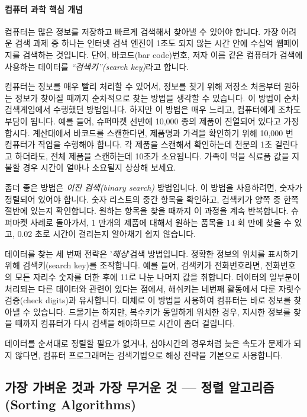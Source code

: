 \documentclass[]{article}
\begin{document}
\mbox{}\paragraph{컴퓨터 과학 핵심 개념}\label{section-101}

컴퓨터는 많은 정보를 저장하고 빠르게 검색해서 찾아낼 수 있어야 합니다.
가장 어려운 검색 과제 중 하나는 인터넷 검색 엔진이 1초도 되지 않는 시간
안에 수십억 웹페이지를 검색하는 것입니다. 단어, 바코드(bar code)번호,
저자 이름 같은 컴퓨터가 검색에 사용하는 데이터를 \emph{``검색키''(search
key)}라고 합니다.

컴퓨터는 정보를 매우 빨리 처리할 수 있어서, 정보를 찾기 위해 저장소
처음부터 원하는 정보가 찾아질 때까지 순차적으로 찾는 방법을 생각할 수
있습니다. 이 방법이 순차검색게임에서 수행했던 방법입니다. 하지만 이
방법은 매우 느리고, 컴퓨터에게 조차도 부담이 됩니다. 예를 들어, 슈퍼마켓
선반에 10,000 종의 제품이 진열되어 있다고 가정합시다. 계산대에서
바코드를 스캔한다면, 제품명과 가격을 확인하기 위해 10,000 번 컴퓨터가
작업을 수행해야 합니다. 각 제품을 스캔해서 확인하는데 천분의 1초
걸린다고 하더라도, 전체 제품을 스캔하는데 10초가 소요됩니다. 가족이 먹을
식료품 값을 지불할 경우 시간이 얼마나 소요될지 상상해 보세요.

좀더 좋은 방법은 \emph{이진 검색(binary search)} 방법입니다. 이 방법을
사용하려면, 숫자가 정렬되어 있어야 합니다. 숫자 리스트의 중간 항목을
확인하고, 검색키가 양쪽 중 한쪽 절반에 있는지 확인합니다. 원하는 항목을
찾을 때까지 이 과정을 계속 반복합니다. 슈퍼마켓 사례로 돌아가서, 1
만개의 제품에 대해서 원하는 품목을 14 회 만에 찾을 수 있고, 0.02 초로
시간이 걸리는지 알아채기 쉽지 않습니다.

데이터를 찾는 세 번째 전략은 '\emph{해싱}'검색 방법입니다. 정확한 정보의
위치를 표시하기 위해 검색키(search key)를 조작합니다. 예를 들어,
검색키가 전화번호라면, 전화번호의 모든 자리수 숫자를 더한 후에 11로 나눈
나머지 값을 취합니다. 데이터의 일부분이 처리되는 다른 데이터와 관련이
있다는 점에서, 해쉬키는 네번째 활동에서 다룬 자릿수 검증(check digits)과
유사합니다. 대체로 이 방법을 사용하여 컴퓨터는 바로 정보를 찾아낼 수
있습니다. 드물기는 하지만, 복수키가 동일하게 위치한 경우, 지시한 정보를
찾을 때까지 컴퓨터가 다시 검색을 해야하므로 시간이 좀더 걸립니다.

데이터를 순서대로 정렬할 필요가 없거나, 심야시간의 경우처럼 늦은 속도가
문제가 되지 않다면, 컴퓨터 프로그래머는 검색기법으로 해싱 전략을
기본으로 사용합니다.

\subsection{가장 가벼운 것과 가장 무거운 것 --- 정렬 알고리즘(Sorting
Algorithms)}\label{mdash--sorting-algorithms}
\end{document}
